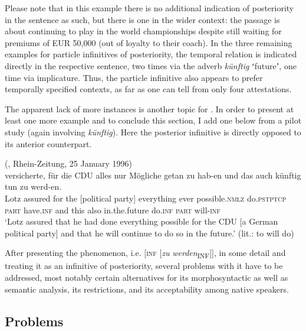 \documentclass[output=paper,hidelinks]{langscibook}
\begin{document}
Please note that in this example there is no additional indication of posteriority in the sentence as such, but there is one in the wider context: the passage is about continuing to play in the world championships despite still waiting for premiums of EUR 50,000 (out of loyalty to their coach). In the three remaining examples for particle infinitives of posteriority, the temporal relation is indicated directly in the respective sentence, two times via the adverb \emph{künftig} ʻfutureʼ, one time via implicature. Thus, the particle infinitive also appears to prefer temporally specified contexts, as far as one can tell from only four attestations.

The apparent lack of more instances is another topic for . In order to present at least one more example and to conclude this section, I add one below from a pilot study (again involving \emph{künftig}). Here the posterior infinitive is directly opposed to its anterior counterpart.

\ea\label{ex:reiner:32}	 (, Rhein-Zeitung, 25 January 1996) \\
	{versicherte,}	{für}	{die}	{CDU} {alles}		{nur}	{Mögliche}		{getan}  {zu}	{hab-en}	{und}	{das}	{auch}	{künftig} {tun}		{zu}		{werd-en.}\\
Lotz	assured	for	the	{[political party]}   everything	ever	possible.\textsc{nmlz}	do.\textsc{pstptcp}  \textsc{part}	have.\textsc{inf}	and	this	also	in.the.future   do.\textsc{inf}		\textsc{part}		will-\textsc{inf}\\
\glt ‘Lotz assured that he had done everything possible for the CDU [a German political party] and that he will continue to do so in the future.’ (lit.: to will do)
\z 

After presenting the phenomenon, i.e. [\textsc{inf} [\emph{zu} \textit{werden}\textsubscript{INF}]], in some detail and treating it as an infinitive of posteriority, several problems with it have to be addressed, most notably certain alternatives for its morphosyntactic as well as semantic analysis, its restrictions, and its acceptability among native speakers.

\subsection{Problems}\label{sec:reiner:2.2}
\end{document}
